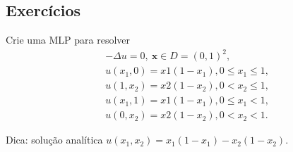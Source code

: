


    


        


\subsection{Exercícios}

\begin{exer}
  Crie uma MLP para resolver
  \begin{align}
    &-\Delta u = 0, ~\pmb{x}\in D = (0, 1)^2,\\
    &u(x_1, 0) = x1(1-x_1), 0 \leq x_1 \leq 1,\\
    &u(1, x_2) = x2(1-x_2), 0 < x_2 \leq 1,\\
    &u(x_1, 1) = x1(1-x_1), 0 \leq x_1 < 1,\\
    &u(0, x_2) = x2(1-x_2), 0 < x_2 < 1.
  \end{align}
\end{exer}
\begin{resp}
  Dica: solução analítica $u(x_1, x_2) = x_1(1-x_1) - x_2(1-x_2)$.
\end{resp}

